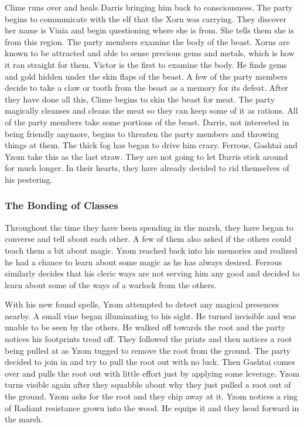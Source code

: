 Clime runs over and heals Darris bringing him back to consciousness. The party begins to communicate with the elf that the Xorn was carrying. They discover her name is Vinia and begin questioning where she is from. She tells them she is from this region. The party members examine the body of the beast. Xorns are known to be attracted and able to sense precious gems and metals, which is how it ran straight for them. Victor is the first to examine the body. He finds gems and gold hidden under the skin flaps of the beast. A few of the party members decide to take a claw or tooth from the beast as a memory for its defeat. After they have done all this, Clime begins to skin the beast for meat. The party magically cleanses and cleans the meat so they can keep some of it as rations. All of the party members take some portions of the beast. Darris, not interested in being friendly anymore, begins to threaten the party members and throwing things at them. The thick fog has began to drive him crazy. Ferrous, Gashtai and Yzom take this as the last straw. They are not going to let Darris stick around for much longer. In their hearts, they have already decided to rid themselves of his pestering. 

\subsubsection{The Bonding of Classes}

Throughout the time they have been spending in the marsh, they have began to converse and tell about each other. A few of them also asked if the others could teach them a bit about magic. Yzom reached back into his memories and realized he had a chance to learn about some magic as he has always desired. Ferrous similarly decides that his cleric ways are not serving him any good and decided to learn about some of the ways of a warlock from the others.

With his new found spells, Yzom attempted to detect any magical presences nearby. A small vine began illuminating to his sight. He turned invisible and was unable to be seen by the others. He walked off towards the root and the party notices his footprints tread off. They followed the prints and then notices a root being pulled at as Yzom tugged to remove the root from the ground. The party decided to join in and try to pull the root out with no luck. Then Gashtai comes over and pulls the root out with little effort just by applying some leverage. Yzom turns visible again after they squabble about why they just pulled a root out of the ground. Yzom asks for the root and they chip away at it. Yzom notices a ring of Radiant resistance grown into the wood. He equips it and they head forward in the marsh.

